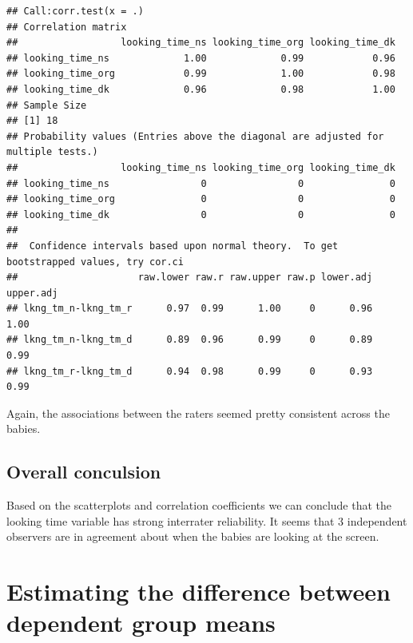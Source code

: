 \documentclass[
]{book}
\newenvironment{Shaded}{\begin{snugshade}}{\end{snugshade}}
\newcommand{\DataTypeTok}[1]{\textcolor[rgb]{0.13,0.29,0.53}{#1}}
\newcommand{\KeywordTok}[1]{\textcolor[rgb]{0.13,0.29,0.53}{\textbf{#1}}}
\newcommand{\NormalTok}[1]{#1}
\newcommand{\OperatorTok}[1]{\textcolor[rgb]{0.81,0.36,0.00}{\textbf{#1}}}
\newcommand{\OtherTok}[1]{\textcolor[rgb]{0.56,0.35,0.01}{#1}}
\newcommand{\StringTok}[1]{\textcolor[rgb]{0.31,0.60,0.02}{#1}}
\begin{document}
\begin{Shaded}
\end{Shaded}

\begin{verbatim}
## Call:corr.test(x = .)
## Correlation matrix 
##                  looking_time_ns looking_time_org looking_time_dk
## looking_time_ns             1.00             0.99            0.96
## looking_time_org            0.99             1.00            0.98
## looking_time_dk             0.96             0.98            1.00
## Sample Size 
## [1] 18
## Probability values (Entries above the diagonal are adjusted for multiple tests.) 
##                  looking_time_ns looking_time_org looking_time_dk
## looking_time_ns                0                0               0
## looking_time_org               0                0               0
## looking_time_dk                0                0               0
## 
##  Confidence intervals based upon normal theory.  To get bootstrapped values, try cor.ci
##                     raw.lower raw.r raw.upper raw.p lower.adj upper.adj
## lkng_tm_n-lkng_tm_r      0.97  0.99      1.00     0      0.96      1.00
## lkng_tm_n-lkng_tm_d      0.89  0.96      0.99     0      0.89      0.99
## lkng_tm_r-lkng_tm_d      0.94  0.98      0.99     0      0.93      0.99
\end{verbatim}

Again, the associations between the raters seemed pretty consistent across the babies.

\hypertarget{overall-conculsion}{%
\section{Overall conculsion}\label{overall-conculsion}}

Based on the scatterplots and correlation coefficients we can conclude that the looking time variable has strong interrater reliability. It seems that 3 independent observers are in agreement about when the babies are looking at the screen.

\hypertarget{estimating-the-difference-between-dependent-group-means}{%
\chapter{Estimating the difference between dependent group means}\label{estimating-the-difference-between-dependent-group-means}}
\end{document}
